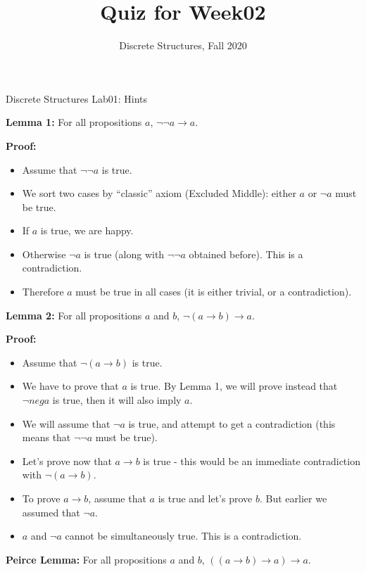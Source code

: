 \documentclass[jou]{apa6}
\title{Quiz for Week02}
\author{Discrete Structures, Fall 2020}
\affiliation{RBS}
\begin{document}

\twocolumn
{\Large Discrete Structures Lab01: Hints}

\thispagestyle{empty}


{\bf Lemma 1:} For all propositions $a$, $\neg \neg a \rightarrow a$. 

{\bf Proof:}

\begin{itemize}
\item Assume that $\neg \neg a$ is true.
\item We sort two cases by ``classic'' axiom (Excluded Middle): either $a$ or $\neg a$ must be true. 
\item If $a$ is true, we are happy. 
\item Otherwise $\neg a$ is true (along with $\neg \neg a$ obtained before). This is a contradiction. 
\item Therefore $a$ must be true in all cases (it is either trivial, or a contradiction).
\end{itemize}

{\bf Lemma 2:} For all propositions $a$ and $b$, $\neg(a \rightarrow b) \rightarrow a$. 

{\bf Proof:}

\begin{itemize}
\item Assume that $\neg (a \rightarrow b)$ is true. 
\item We have to prove that $a$ is true. By Lemma 1, we will prove instead that $\neg neg a$ is true, 
then it will also imply $a$. 
\item We will assume that $\neg a$ is true, and attempt to get a contradiction (this means that $\neg \neg a$ must
be true). 
\item Let's prove now that $a \rightarrow b$ is true - this would be an immediate 
contradiction with $\neg (a \rightarrow b)$. 
\item To prove $a \rightarrow b$, assume that $a$ is true and let's prove $b$. But earlier
we assumed that $\neg a$. 
\item $a$ and $\neg a$ cannot be simultaneously true. This is a contradiction.
\end{itemize}

{\bf Peirce Lemma:} For all propositions $a$ and $b$, $((a \rightarrow b) \rightarrow a) \rightarrow a$.
\end{document}

